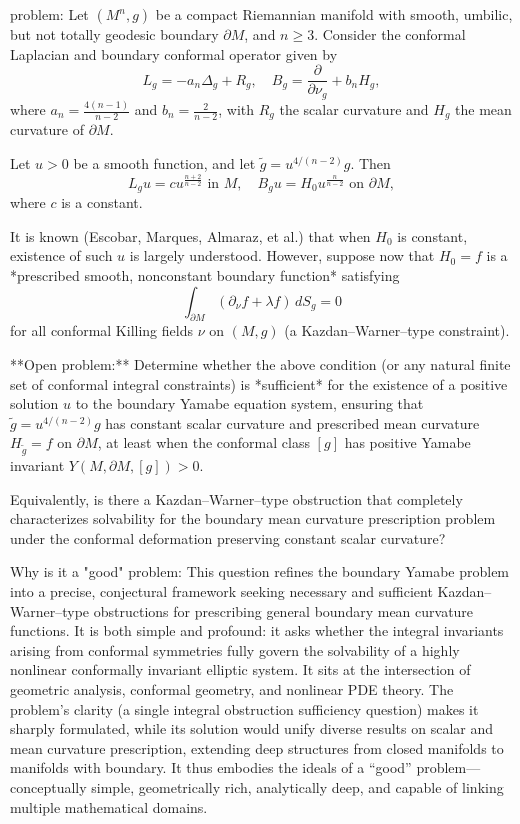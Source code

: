 problem:  
Let \((M^n,g)\) be a compact Riemannian manifold with smooth, umbilic, but not totally geodesic boundary \(\partial M\), and \(n \ge 3\).  
Consider the conformal Laplacian and boundary conformal operator given by  
\[
L_g = -a_n \Delta_g + R_g, \quad B_g = \frac{\partial}{\partial \nu_g} + b_n H_g,
\]
where \(a_n = \frac{4(n-1)}{n-2}\) and \(b_n = \frac{2}{n-2}\), with \(R_g\) the scalar curvature and \(H_g\) the mean curvature of \(\partial M\).  

Let \(u>0\) be a smooth function, and let \(\tilde g = u^{4/(n-2)} g\). Then  
\[
L_g u = c u^{\frac{n+2}{n-2}} \text{ in } M, \quad B_g u = H_0 u^{\frac{n}{n-2}} \text{ on } \partial M,
\]
where \(c\) is a constant.  

It is known (Escobar, Marques, Almaraz, et al.) that when \(H_0\) is constant, existence of such \(u\) is largely understood. However, suppose now that \(H_0 = f\) is a *prescribed smooth, nonconstant boundary function* satisfying  
\[
\int_{\partial M} (\partial_\nu f + \lambda f) \, dS_g = 0
\]
for all conformal Killing fields \(\nu\) on \((M,g)\) (a Kazdan–Warner–type constraint).  

**Open problem:** Determine whether the above condition (or any natural finite set of conformal integral constraints) is *sufficient* for the existence of a positive solution \(u\) to the boundary Yamabe equation system, ensuring that \(\tilde g = u^{4/(n-2)}g\) has constant scalar curvature and prescribed mean curvature \(H_{\tilde g}=f\) on \(\partial M\), at least when the conformal class \([g]\) has positive Yamabe invariant \(Y(M,\partial M,[g])>0.\)  

Equivalently, is there a Kazdan–Warner–type obstruction that completely characterizes solvability for the boundary mean curvature prescription problem under the conformal deformation preserving constant scalar curvature?  

Why is it a "good" problem:  
This question refines the boundary Yamabe problem into a precise, conjectural framework seeking necessary and sufficient Kazdan–Warner–type obstructions for prescribing general boundary mean curvature functions. It is both simple and profound: it asks whether the integral invariants arising from conformal symmetries fully govern the solvability of a highly nonlinear conformally invariant elliptic system. It sits at the intersection of geometric analysis, conformal geometry, and nonlinear PDE theory. The problem’s clarity (a single integral obstruction sufficiency question) makes it sharply formulated, while its solution would unify diverse results on scalar and mean curvature prescription, extending deep structures from closed manifolds to manifolds with boundary. It thus embodies the ideals of a “good” problem—conceptually simple, geometrically rich, analytically deep, and capable of linking multiple mathematical domains.